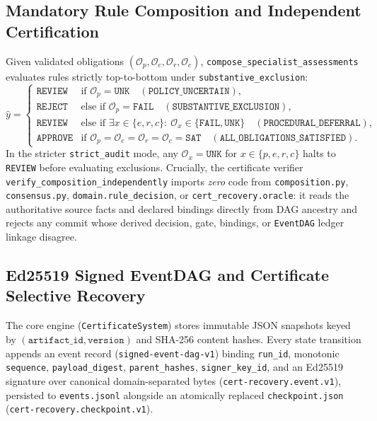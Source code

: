 \documentclass[11pt,a4paper]{article}
\begin{document}
\subsection{Mandatory Rule Composition and Independent Certification}
Given validated obligations $(\mathcal{O}_p, \mathcal{O}_e, \mathcal{O}_r, \mathcal{O}_c)$, \texttt{compose\_specialist\_assessments} evaluates rules strictly top-to-bottom under \texttt{substantive\_exclusion}:
\begin{equation}
\hat{y} =
\begin{cases}
\texttt{REVIEW}  & \text{if } \mathcal{O}_p = \texttt{UNK} \quad (\texttt{POLICY\_UNCERTAIN}),\\
\texttt{REJECT}  & \text{else if } \mathcal{O}_p = \texttt{FAIL} \quad (\texttt{SUBSTANTIVE\_EXCLUSION}),\\
\texttt{REVIEW}  & \text{else if } \exists x \in \{e,r,c\}:\ \mathcal{O}_x \in \{\texttt{FAIL}, \texttt{UNK}\} \quad (\texttt{PROCEDURAL\_DEFERRAL}),\\
\texttt{APPROVE} & \text{if } \mathcal{O}_p = \mathcal{O}_e = \mathcal{O}_r = \mathcal{O}_c = \texttt{SAT} \quad (\texttt{ALL\_OBLIGATIONS\_SATISFIED}).
\end{cases}
\end{equation}
In the stricter \texttt{strict\_audit} mode, any $\mathcal{O}_x = \texttt{UNK}$ for $x \in \{p,e,r,c\}$ halts to \texttt{REVIEW} before evaluating exclusions. Crucially, the certificate verifier \texttt{verify\_composition\_independently} imports \emph{zero} code from \texttt{composition.py}, \texttt{consensus.py}, \texttt{domain.rule\_decision}, or \texttt{cert\_recovery.oracle}: it reads the authoritative source facts and declared bindings directly from DAG ancestry and rejects any commit whose derived decision, gate, bindings, or \texttt{EventDAG} ledger linkage disagree.

\subsection{Ed25519 Signed EventDAG and Certificate Selective Recovery}
The core engine (\texttt{CertificateSystem}) stores immutable JSON snapshots keyed by $(\texttt{artifact\_id}, \texttt{version})$ and SHA-256 content hashes. Every state transition appends an event record (\texttt{signed-event-dag-v1}) binding \texttt{run\_id}, monotonic \texttt{sequence}, \texttt{payload\_digest}, \texttt{parent\_hashes}, \texttt{signer\_key\_id}, and an Ed25519 signature over canonical domain-separated bytes (\texttt{cert-recovery.event.v1}), persisted to \texttt{events.jsonl} alongside an atomically replaced \texttt{checkpoint.json} (\texttt{cert-recovery.checkpoint.v1}).
\end{document}
